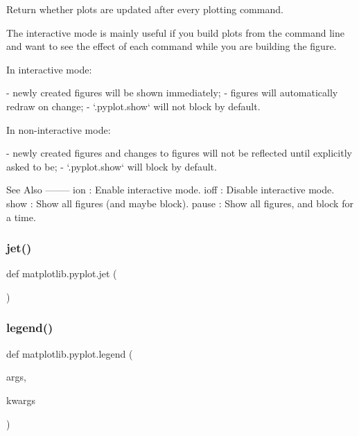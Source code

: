 \begin{DoxyVerb}Return whether plots are updated after every plotting command.

The interactive mode is mainly useful if you build plots from the command
line and want to see the effect of each command while you are building the
figure.

In interactive mode:

- newly created figures will be shown immediately;
- figures will automatically redraw on change;
- `.pyplot.show` will not block by default.

In non-interactive mode:

- newly created figures and changes to figures will not be reflected until
  explicitly asked to be;
- `.pyplot.show` will block by default.

See Also
--------
ion : Enable interactive mode.
ioff : Disable interactive mode.
show : Show all figures (and maybe block).
pause : Show all figures, and block for a time.
\end{DoxyVerb}
 \mbox{\label{namespacematplotlib_1_1pyplot_a0d1cf605919e4c6a3cdb55c35700ca05}} 
\subsubsection{\texorpdfstring{jet()}{jet()}}
{\footnotesize\ttfamily def matplotlib.\+pyplot.\+jet (\begin{DoxyParamCaption}{ }\end{DoxyParamCaption})}

\mbox{\label{namespacematplotlib_1_1pyplot_a204a6959ab33c681d90bc2dfcb721de9}} 
\subsubsection{\texorpdfstring{legend()}{legend()}}
{\footnotesize\ttfamily def matplotlib.\+pyplot.\+legend (\begin{DoxyParamCaption}\item[{}]{args,  }\item[{}]{kwargs }\end{DoxyParamCaption})}

